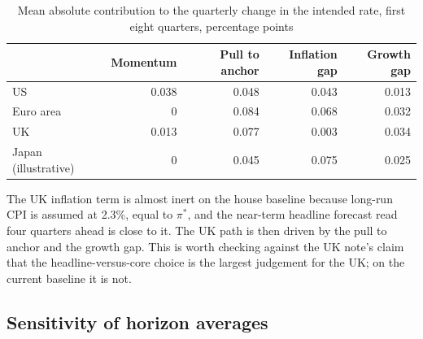 \documentclass[11pt,a4paper]{article}
\newcommand{\pis}{\pi^{*}}
\begin{document}
\begin{table}[htbp]
\centering\small
\caption{Mean absolute contribution to the quarterly change in the intended rate, first eight quarters, percentage points}
\label{tab:contrib}
\begin{tabular}{@{}lrrrr@{}}
\toprule
 & Momentum & Pull to anchor & Inflation gap & Growth gap \\
\midrule
US & 0.038 & 0.048 & 0.043 & 0.013 \\
Euro area & 0 & 0.084 & 0.068 & 0.032 \\
UK & 0.013 & 0.077 & 0.003 & 0.034 \\
Japan (illustrative) & 0 & 0.045 & 0.075 & 0.025 \\
\bottomrule
\end{tabular}
\end{table}

The UK inflation term is almost inert on the house baseline because long-run CPI is assumed at 2.3\%, equal to $\pis$, and the near-term headline forecast read four quarters ahead is close to it. The UK path is then driven by the pull to anchor and the growth gap. This is worth checking against the UK note's claim that the headline-versus-core choice is the largest judgement for the UK; on the current baseline it is not.

\subsection{Sensitivity of horizon averages}
\end{document}
